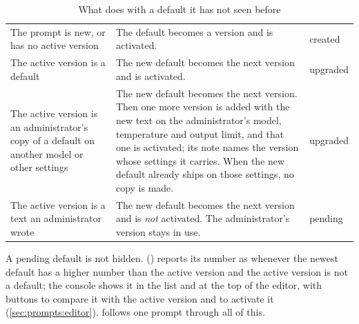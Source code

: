 \begin{table}[H]
\caption{What  does with a default it has not seen before}\label{tab:prompts:seed}
\begin{tabularx}{\textwidth}{@{}L{47mm}Yl@{}}
\toprule
{} &  &  \\
\midrule
The prompt is new, or has no active version & The default becomes a version and is activated. & created \\
The active version is a default & The new default becomes the next version and is activated. & upgraded \\
The active version is an administrator's copy of a default on another model or other settings & The new default becomes the next version. Then one more version is added with the new text on the administrator's model, temperature and output limit, and that one is activated; its note names the version whose settings it carries. When the new default already ships on those settings, no copy is made. & upgraded \\
The active version is a text an administrator wrote & The new default becomes the next version and is \emph{not} activated. The administrator's version stays in use. & pending \\
\bottomrule
\end{tabularx}
\end{table}

A pending default is not hidden.  ()
reports its number as  whenever the newest default has a higher number
than the active version and the active version is not a default; the console shows it in the
list and at the top of the editor, with buttons to compare it with the active version and to
activate it (\cref{sec:prompts:editor}).  follows one prompt through
all of this.


